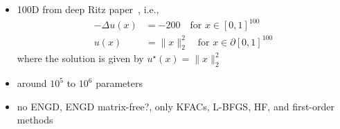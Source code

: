 \begin{itemize}
\item 100D from deep Ritz paper~\citep{yu2018deep}, i.e.,
  \begin{align*}
    -\Delta u(x) & = -200 \quad \text{for } x\in [0,1]^{100} \\
    u(x) & = \lVert x \rVert_2^2 \quad \text{for } x\in \partial[0,1]^{100}
  \end{align*}
  where the solution is given by $u^\star(x) = \lVert x \rVert_2^2$
\item around $10^5$ to $10^6$ parameters
\item no ENGD, ENGD matrix-free?, only KFACs, L-BFGS, HF, and first-order methods
\end{itemize}

